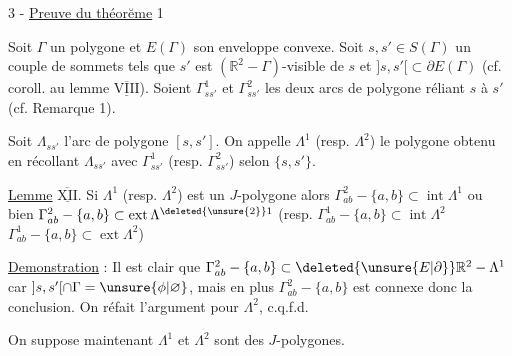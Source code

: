 3 - \uline{Preuve du théorĕme} 1

\margin{!}Soit $\Gamma$ un polygone et $E(\Gamma)$ son enveloppe convexe. Soit $s,s'\in S(\Gamma)$ un couple de sommets  tels que $s'$ est $(\mathbb{R}^2-\Gamma)$-visible de $s$ et $]s,s'[\subset\partial E(\Gamma)$ (cf. coroll. au lemme $\underline{\overline{\mathrm{VIII}}}$). Soient $\Gamma^1_{ss'}$ et $\Gamma^2_{ss'}$ les deux arcs de polygone  réliant $s$ à $s'$ (cf. Remarque 1).

Soit $\Lambda_{ss'}$ l'arc de polygone $[s,s']$. On appelle $\Lambda^1$ (resp. $\Lambda^2$) le polygone obtenu en récollant $\Lambda_{ss'}$ avec $\Gamma^1_{ss'}$ (resp. $\Gamma^2_{ss'}$) selon $\{s,s'\}$.

\uline{Lemme} $\underline{\overline{\mathrm{XII}}}$. Si $\Lambda^1$ (resp. $\Lambda^2$) est un $J$-polygone alors $\Gamma^2_{ab}-\{a,b\}\subset\operatorname{int}\Lambda^1$ ou bien $\Gamma^2_{ab}-\{a,b\}\subset\operatorname{ext}\Lambda^{\deleted{\unsure{2}}1}$ (resp. $\Gamma^1_{ab}-\{a,b\}\subset\operatorname{int}\Lambda^2$ $\Gamma^1_{ab}-\{a,b\}\subset\operatorname{ext}\Lambda^2$)

\uline{Demonstration} : Il est clair que $\Gamma^2_{ab}-\{a,b\}\subset\deleted{\unsure{E|\partial}}\mathbb{R}^2-\Lambda^1$ car $]s,s'[\cap\Gamma=\unsure{\phi|\varnothing}$, mais en plus $\Gamma^2_{ab}-\{a,b\}$ est connexe donc la conclusion. On réfait l'argument pour $\Lambda^2$, c.q.f.d.

On suppose maintenant  $\Lambda^1$ et $\Lambda^2$  sont des $J$-polygones.

